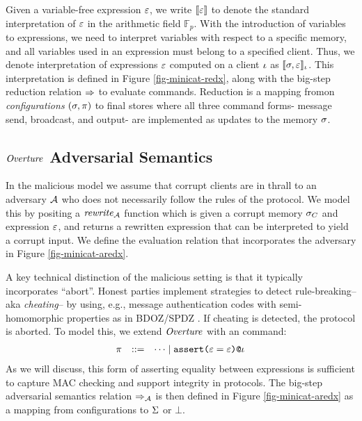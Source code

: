 Given a variable-free expression $\varepsilon$, we write $\llbracket \varepsilon \rrbracket$ to denote
the standard interpretation of $\varepsilon$ in the arithmetic field
$\mathbb{F}_{p}$. With the introduction of variables to expressions,
we need to interpret variables with respect to a specific memory, and
all variables used in an expression must belong to a specified client.
Thus, we denote interpretation of expressions $\varepsilon$ computed on a
client $\iota$ as $\llbracket \sigma,\varepsilon \rrbracket_{\iota}$. This interpretation is
defined in Figure \ref{fig-minicat-redx}, along with the big-step
reduction relation $\Rightarrow$ to evaluate commands. Reduction is a mapping
fromon \emph{configurations} $(\sigma,\pi)$ to final stores
where all three command forms- message send, broadcast, and
output- are implemented as updates to the memory $\sigma$. 

\subsection{$\mathit{Overture}$ Adversarial Semantics}
  
\minicataredxfig

In the malicious model we assume that corrupt clients are in
thrall to an adversary $\mathcal{A}$ who does not necessarily follow
the rules of the protocol.  We model this by positing a $\mathit{rewrite}_{\mathcal{A}}$
function which is given a corrupt memory $\sigma_C$ and expression
$\varepsilon$, and returns a rewritten expression that can be interpreted to
yield a corrupt input. We define the evaluation relation that
incorporates the adversary in Figure \ref{fig-minicat-aredx}.

A key technical distinction of the malicious setting is that it
typically incorporates ``abort''. Honest parties implement strategies
to detect rule-breaking-- aka \emph{cheating}-- by using, e.g.,
message authentication codes with semi-homomorphic properties as in
BDOZ/SPDZ \cite{10.1007/978-3-030-68869-1_3}. If cheating is detected,
the protocol is aborted. To model this, we extend $\mathit{Overture}$ with an
 command:
$$
    \begin{array}{rcl@{\hspace{2mm}}r}
      \prog &::=& \cdots \mid \elab{\assert{\be = \be}}{\cid}
    \end{array}
$$
As we will discuss, this form of asserting equality between expressions
is sufficient to capture MAC checking and support integrity in protocols.
The big-step adversarial semantics relation $\Rightarrow_{\mathcal{A}}$ is then defined
in Figure \ref{fig-minicat-aredx} as a mapping from configurations to
$\Sigma$ or $\bot$.
